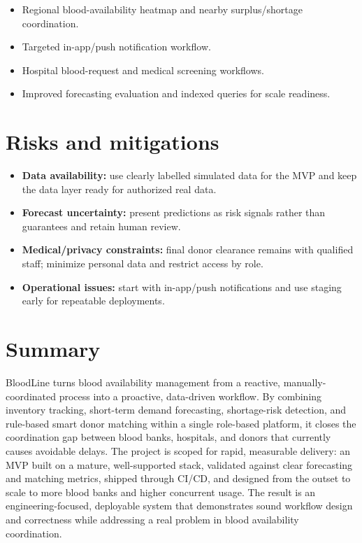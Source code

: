 \documentclass[11pt]{article}
\begin{document}
\begin{itemize}
\item Regional blood-availability heatmap and nearby surplus/shortage coordination.
\item Targeted in-app/push notification workflow.
\item Hospital blood-request and medical screening workflows.
\item Improved forecasting evaluation and indexed queries for scale readiness.
\end{itemize}

\section{Risks and mitigations}

\begin{itemize}
\item \textbf{Data availability:} use clearly labelled simulated data for the MVP and keep the data
layer ready for authorized real data.
\item \textbf{Forecast uncertainty:} present predictions as risk signals rather than guarantees and
retain human review.
\item \textbf{Medical/privacy constraints:} final donor clearance remains with qualified staff; minimize personal data and restrict access by role.
\item \textbf{Operational issues:} start with in-app/push notifications and use staging early for repeatable deployments.
\end{itemize}

\section{Summary}

BloodLine turns blood availability management from a reactive, manually-coordinated process into
a proactive, data-driven workflow. By combining inventory tracking, short-term demand
forecasting, shortage-risk detection, and rule-based smart donor matching within a single
role-based platform, it closes the coordination gap between blood banks, hospitals, and donors
that currently causes avoidable delays. The project is scoped for rapid, measurable delivery: an
MVP built on a mature, well-supported stack, validated against clear forecasting and matching
metrics, shipped through CI/CD, and designed from the outset to scale to more blood banks and
higher concurrent usage. The result is an engineering-focused, deployable system that
demonstrates sound workflow design and correctness while addressing a real problem in blood
availability coordination.
\end{document}
